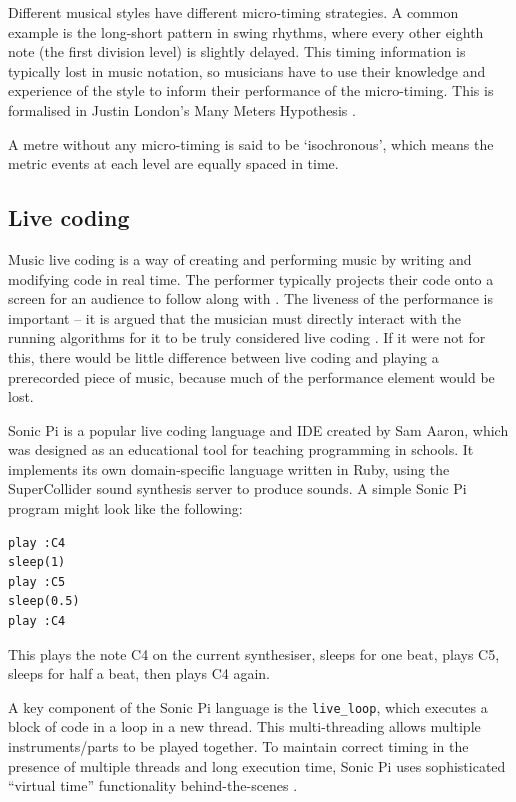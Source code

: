 \documentclass[12pt,twoside,openright]{report}
\begin{document}
Different
musical styles have different micro-timing strategies. A common example is the
long-short pattern in swing rhythms, where every other eighth note (the first
division level) is slightly delayed. This timing information is typically lost
in music notation, so musicians have to use
their knowledge and experience of the style to inform their performance of the
micro-timing. This is formalised in Justin London's Many Meters Hypothesis
\cite{london2012}.

A metre without any micro-timing is said to be `isochronous',
which means the metric events at each level are equally spaced in time.


\subsection{Live coding} \label{live_coding_background}

Music live coding is a way of creating and performing music by writing and
modifying code in real time. The performer typically projects their code onto a
screen for an audience to follow along with \cite{magnusson2011}. The liveness of the
performance is important -- it is argued that the musician must directly
interact with the running algorithms for it to be truly considered live coding
\cite{collins2011}. If it were not for this, there would be little difference between live coding and playing a prerecorded piece of music, because much of the performance element would be lost.

Sonic Pi \cite{aaron2013} is a popular live coding language and IDE created by Sam Aaron, which
was designed as an educational tool for teaching programming in schools. It
implements its own domain-specific language written in Ruby, using the
SuperCollider sound synthesis server to produce sounds. A simple
Sonic Pi program might look like the following:

\begin{verbatim}
play :C4
sleep(1)
play :C5
sleep(0.5)
play :C4
\end{verbatim}

This plays the note C4 on the current synthesiser, sleeps for one beat, plays C5,
sleeps for half a beat, then plays C4 again.

A key component of the Sonic Pi language is the \verb'live_loop', which executes a
block of code in a loop in a new thread. This multi-threading allows multiple instruments/parts to be played together. To maintain correct timing in the presence
of multiple threads and long execution time, Sonic Pi uses sophisticated
``virtual time'' functionality behind-the-scenes \cite{aaron2014}.
\end{document}
